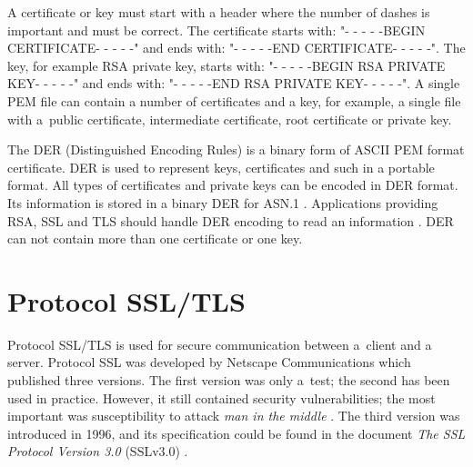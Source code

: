 \documentclass[
  oneside, 12pt, 
  printed, %
  notable,   %
  nolof,     %
  nolot,     %
]{fithesis3}
\begin{document}

A certificate or key must start with a header where the number of dashes is important and must be 
correct. The certificate starts with: "- - - - -BEGIN CERTIFICATE- - - - -" and ends with: "- - - - -END CERTIFICATE- - - - -". The key, for example RSA private key, starts with: "- - - - -BEGIN RSA PRIVATE KEY- - - - -" and ends with: "- - - - -END RSA PRIVATE KEY- - - - -". A single PEM file can 
contain a number of certificates and a key, for example, a single file with a~public certificate, 
intermediate certificate, root certificate or private key.

The DER (Distinguished Encoding Rules) is a binary form of ASCII PEM format certificate. DER is used 
to represent keys, certificates and such in a portable format. All types of certificates and private 
keys can be encoded in DER format. Its information is stored in a binary DER for ASN.1 \cite{asn.1}. 
Applications providing RSA, SSL and TLS should handle DER encoding to read an information \cite{bakker_2014}. DER can not contain more than one certificate or one key.

\section{Protocol SSL/TLS}
Protocol SSL/TLS is used for secure communication between a~client and a server. Protocol SSL was 
developed by Netscape Communications which published three versions. The first version was only 
a~test; the second has been used in practice. However, it still contained security vulnerabilities; 
the most important was susceptibility to attack \textit{man in the middle} \cite{oppliger2003security}. The third version was introduced in 1996, and its specification could 
be found in the document \textit{The SSL Protocol Version 3.0} (SSLv3.0) \cite{freier2011secure}. 
\end{document}
